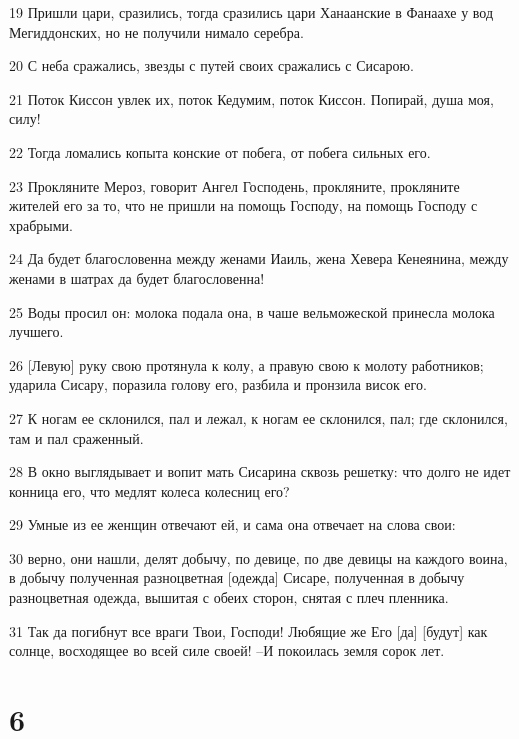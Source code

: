 \par 19 Пришли цари, сразились, тогда сразились цари Ханаанские в Фанаахе у вод Мегиддонских, но не получили нимало серебра.
\par 20 С неба сражались, звезды с путей своих сражались с Сисарою.
\par 21 Поток Киссон увлек их, поток Кедумим, поток Киссон. Попирай, душа моя, силу!
\par 22 Тогда ломались копыта конские от побега, от побега сильных его.
\par 23 Прокляните Мероз, говорит Ангел Господень, прокляните, прокляните жителей его за то, что не пришли на помощь Господу, на помощь Господу с храбрыми.
\par 24 Да будет благословенна между женами Иаиль, жена Хевера Кенеянина, между женами в шатрах да будет благословенна!
\par 25 Воды просил он: молока подала она, в чаше вельможеской принесла молока лучшего.
\par 26 [Левую] руку свою протянула к колу, а правую свою к молоту работников; ударила Сисару, поразила голову его, разбила и пронзила висок его.
\par 27 К ногам ее склонился, пал и лежал, к ногам ее склонился, пал; где склонился, там и пал сраженный.
\par 28 В окно выглядывает и вопит мать Сисарина сквозь решетку: что долго не идет конница его, что медлят колеса колесниц его?
\par 29 Умные из ее женщин отвечают ей, и сама она отвечает на слова свои:
\par 30 верно, они нашли, делят добычу, по девице, по две девицы на каждого воина, в добычу полученная разноцветная [одежда] Сисаре, полученная в добычу разноцветная одежда, вышитая с обеих сторон, снятая с плеч пленника.
\par 31 Так да погибнут все враги Твои, Господи! Любящие же Его [да] [будут] как солнце, восходящее во всей силе своей! --И покоилась земля сорок лет.

\chapter{6}


